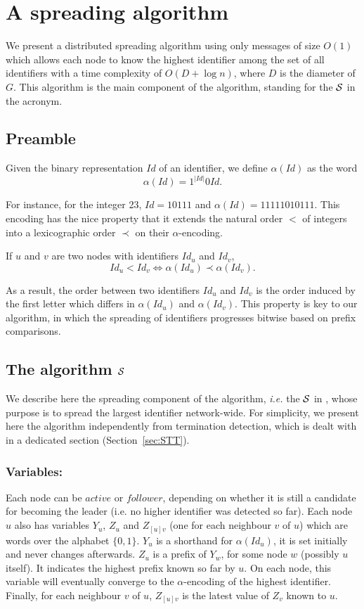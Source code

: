 \documentclass[11pt,envcountsame,letterpaper]{llncs}
\begin{document}
\section{A spreading algorithm}
\label{sec:S}
We present a distributed spreading
algorithm 
using only messages of size $O(1)$  which allows each node to know
the highest identifier among the set of all identifiers with a time
complexity of $O(D+\log n)$, where $D$ is the diameter of $G$. This algorithm is the main component of the \STT algorithm, standing for the ${\cal S}$ in the acronym.

\subsection{Preamble}
 
Given
the binary representation $Id$ of an identifier,
we define 
$\alpha(Id)$ as the word
$$
\alpha(Id)=1^{|Id|} 0  Id.
$$

For instance, for the integer 23, $Id=10111$ and $\alpha(Id)=11111010111$. This encoding has the nice property that it extends the natural order $<$ of integers into a lexicographic order $\prec$ on their $\alpha$-encoding.



  \label{rem:lexicographic}
If $u$ and $v$ are two nodes with identifiers $Id_u$ and
$Id_v$,
$$
Id_u <  Id_v \Leftrightarrow  \alpha(Id_u) \prec \alpha(Id_v).
$$

As a result, the order between two identifiers $Id_u$ and $Id_v$
is the order induced by the first letter which differs in $\alpha(Id_u)$ and $\alpha(Id_v)$.
This property is key to our algorithm, in which the spreading of identifiers progresses bitwise based on prefix comparisons.

\subsection{The  algorithm $\cal S$}
We describe here the spreading component of the algorithm, {\it i.e.} the $\cal S$ in \STT, whose purpose is to spread the largest identifier network-wide. For simplicity, we present here the algorithm independently from termination detection, which is dealt with in a dedicated section (Section~\ref{sec:STT}).

\subsubsection{Variables:} Each node can be $active$ or $follower$, depending on whether it is still a candidate for becoming the leader (i.e. no higher identifier was detected so far). Each node $u$ also has variables $Y_u$, $Z_u$ and
$Z_{[u]v}$  (one for each neighbour $v$ of $u$) which are words over the alphabet $\{0,1\}$. $Y_u$ is a shorthand for $\alpha(Id_u)$, it is set initially and never changes afterwards. $Z_u$ is a prefix of $Y_w$, for some node $w$ (possibly $u$ itself). It indicates the highest prefix known so far by $u$.
On each node, this variable will eventually converge to the $\alpha$-encoding of the highest identifier. Finally, for each neighbour $v$ of $u$, 
$Z_{[u]v}$ is the latest value of $Z_v$ known to $u$. 
\end{document}
